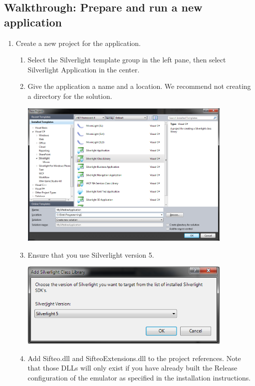 \documentclass[12pt]{article}
\begin{document}
\subsection{Walkthrough: Prepare and run a new application}
\begin{enumerate}

\item Create a new project for the application.
\begin{enumerate}
\item Select the Silverlight template group in the left pane, then select Silverlight Application in the center.
\item Give the application a name and a location. We recommend not creating a directory for the solution.
\begin{center}\includegraphics[width=4in]{1-1-NewProjectDialog}\end{center}
\item Ensure that you use Silverlight version 5.
\begin{center}\includegraphics[width=4in]{1-2-NewSilverlightApp}\end{center}
\item Add Sifteo.dll and SifteoExtensions.dll to the project references. Note that those DLLs will only exist if you have already built the Release configuration of the emulator as specified in the installation instructions.

\end{enumerate}
\end{enumerate}
\end{document}
